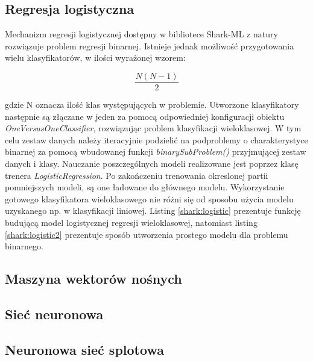 \newpage
{}

\subsection{Regresja logistyczna}

Mechanizm regresji logistycznej dostępny w bibliotece Shark-ML z natury rozwiązuje problem regresji binarnej. Istnieje jednak możliwość przygotowania wielu klasyfikatorów, w ilości wyrażonej wzorem:

\begin{equation}
	\frac{N(N-1)}{2}	
\end{equation}

gdzie N oznacza ilość klas występujących w problemie. Utworzone klasyfikatory następnie są złączane w jeden za pomocą odpowiedniej konfiguracji obiektu \textit{OneVersusOneClassifier}, rozwiązując problem klasyfikacji wieloklasowej. W tym celu zestaw danych należy iteracyjnie podzielić na podproblemy o charakterystyce binarnej za pomocą wbudowanej funkcji \textit{binarySubProblem()} przyjmującej zestaw danych i klasy. Nauczanie poszczególnych modeli realizowane jest poprzez klasę trenera \textit{LogisticRegression}. Po zakończeniu trenowania okreslonej partii pomniejszych modeli, są one ładowane do głównego modelu. Wykorzystanie gotowego klasyfikatora wieloklasowego nie różni się od sposobu użycia modelu uzyskanego np. w klasyfikacji liniowej. Listing \ref{shark:logistic} prezentuje funkcję budującą model logistycznej regresji wieloklasowej, natomiast listing \ref{shark:logistic2} prezentuje sposób utworzenia prostego modelu dla problemu binarnego.



\subsection{Maszyna wektorów nośnych}
\subsection{Sieć neuronowa}
\subsection{Neuronowa sieć splotowa}

